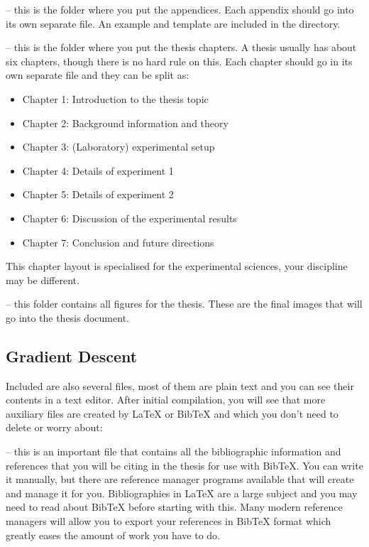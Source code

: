  -- this is the folder where you put the appendices. Each appendix should go into its own separate  file. An example and template are included in the directory.

 -- this is the folder where you put the thesis chapters. A thesis usually has about six chapters, though there is no hard rule on this. Each chapter should go in its own separate  file and they can be split as:
\begin{itemize}
\item Chapter 1: Introduction to the thesis topic
\item Chapter 2: Background information and theory
\item Chapter 3: (Laboratory) experimental setup
\item Chapter 4: Details of experiment 1
\item Chapter 5: Details of experiment 2
\item Chapter 6: Discussion of the experimental results
\item Chapter 7: Conclusion and future directions
\end{itemize}
This chapter layout is specialised for the experimental sciences, your discipline may be different.

 -- this folder contains all figures for the thesis. These are the final images that will go into the thesis document.

\subsection{Gradient Descent}

Included are also several files, most of them are plain text and you can see their contents in a text editor. After initial compilation, you will see that more auxiliary files are created by \LaTeX{} or BibTeX and which you don't need to delete or worry about:

 -- this is an important file that contains all the bibliographic information and references that you will be citing in the thesis for use with BibTeX. You can write it manually, but there are reference manager programs available that will create and manage it for you. Bibliographies in \LaTeX{} are a large subject and you may need to read about BibTeX before starting with this. Many modern reference managers will allow you to export your references in BibTeX format which greatly eases the amount of work you have to do.

